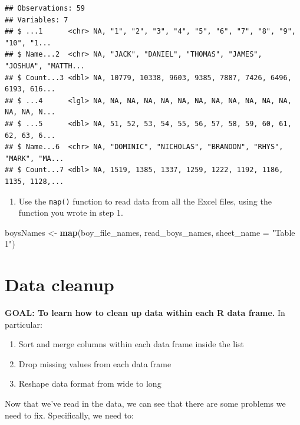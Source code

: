 \documentclass[]{book}
\newenvironment{Shaded}{\begin{snugshade}}{\end{snugshade}}
\newcommand{\DataTypeTok}[1]{\textcolor[rgb]{0.13,0.29,0.53}{#1}}
\newcommand{\KeywordTok}[1]{\textcolor[rgb]{0.13,0.29,0.53}{\textbf{#1}}}
\newcommand{\NormalTok}[1]{#1}
\newcommand{\StringTok}[1]{\textcolor[rgb]{0.31,0.60,0.02}{#1}}
\providecommand{\tightlist}{%
  \setlength{\itemsep}{0pt}\setlength{\parskip}{0pt}}
\begin{document}
\begin{verbatim}
## Observations: 59
## Variables: 7
## $ ...1      <chr> NA, "1", "2", "3", "4", "5", "6", "7", "8", "9", "10", "1...
## $ Name...2  <chr> NA, "JACK", "DANIEL", "THOMAS", "JAMES", "JOSHUA", "MATTH...
## $ Count...3 <dbl> NA, 10779, 10338, 9603, 9385, 7887, 7426, 6496, 6193, 616...
## $ ...4      <lgl> NA, NA, NA, NA, NA, NA, NA, NA, NA, NA, NA, NA, NA, NA, N...
## $ ...5      <dbl> NA, 51, 52, 53, 54, 55, 56, 57, 58, 59, 60, 61, 62, 63, 6...
## $ Name...6  <chr> NA, "DOMINIC", "NICHOLAS", "BRANDON", "RHYS", "MARK", "MA...
## $ Count...7 <dbl> NA, 1519, 1385, 1337, 1259, 1222, 1192, 1186, 1135, 1128,...
\end{verbatim}

\begin{enumerate}
\def\labelenumi{\arabic{enumi}.}
\setcounter{enumi}{2}
\tightlist
\item
  Use the \texttt{map()} function to read data from all the Excel files, using the function you wrote in step 1.
\end{enumerate}

\begin{Shaded}
\begin{Highlighting}[]
\NormalTok{boysNames <-}\StringTok{ }\KeywordTok{map}\NormalTok{(boy_file_names, read_boys_names, }\DataTypeTok{sheet_name =} \StringTok{"Table 1"}\NormalTok{)}
\end{Highlighting}
\end{Shaded}

\hypertarget{data-cleanup}{%
\section{Data cleanup}\label{data-cleanup}}

\textbf{GOAL: To learn how to clean up data within each R data frame.} In particular:

\begin{enumerate}
\def\labelenumi{\arabic{enumi}.}
\tightlist
\item
  Sort and merge columns within each data frame inside the list
\item
  Drop missing values from each data frame
\item
  Reshape data format from wide to long
\end{enumerate}

Now that we've read in the data, we can see that there are some
problems we need to fix. Specifically, we need to:
\end{document}
